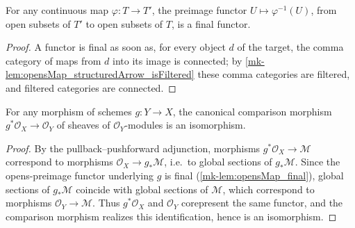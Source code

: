 \begin{lemma}\label{mk-lem:opensMap_final}
  \leanok

  For any continuous map \(\varphi : T \to T'\), the preimage functor
  \(U \mapsto \varphi^{-1}(U)\), from open subsets of \(T'\) to open subsets of \(T\), is a
  final functor.
\end{lemma}
\begin{proof}
  \leanok{}
  A functor is final as soon as, for every object \(d\) of the target, the comma category of
  maps from \(d\) into its image is connected; by
  \ref{mk-lem:opensMap_structuredArrow_isFiltered} these comma categories are filtered, and
  filtered categories are connected.
\end{proof}

\begin{lemma}\label{mk-lem:module_pullback_unit_iso}
  \leanok

  For any morphism of schemes \(g : Y \to X\), the canonical comparison morphism
  \(g^*\mathcal{O}_X \to \mathcal{O}_Y\) of sheaves of \(\mathcal{O}_Y\)-modules is an
  isomorphism.
\end{lemma}
\begin{proof}
  \leanok{}
  By the pullback--pushforward adjunction, morphisms \(g^*\mathcal{O}_X \to \mathcal{M}\)
  correspond to morphisms \(\mathcal{O}_X \to g_*\mathcal{M}\), i.e.\ to global sections of
  \(g_*\mathcal{M}\). Since the opens-preimage functor underlying \(g\) is final
  (\ref{mk-lem:opensMap_final}), global sections of \(g_*\mathcal{M}\) coincide with global
  sections of \(\mathcal{M}\), which correspond to morphisms \(\mathcal{O}_Y \to \mathcal{M}\).
  Thus \(g^*\mathcal{O}_X\) and \(\mathcal{O}_Y\) corepresent the same functor, and the
  comparison morphism realizes this identification, hence is an isomorphism.
\end{proof}

